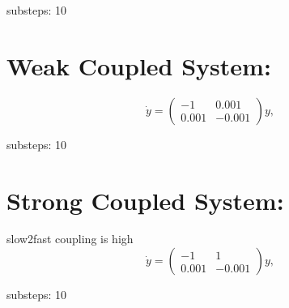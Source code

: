 \documentclass[a4paper,10pt]{article}
\begin{document}
substeps: 10\\


\section{Weak Coupled System:}
\begin{equation}
 \dot{y}= \left( 
        \begin{array}{cc}
           -1 & 0.001 \\
            0.001 & -0.001
        \end{array}
     \right) y,
\end{equation}

substeps: 10\\



\section{Strong Coupled System:}
slow2fast coupling is high
\begin{equation}
 \dot{y}=  \left( 
        \begin{array}{cc}
           -1 & 1 \\
            0.001 & -0.001
        \end{array}
     \right) y,
\end{equation}

substeps: 10\\

\end{document}
